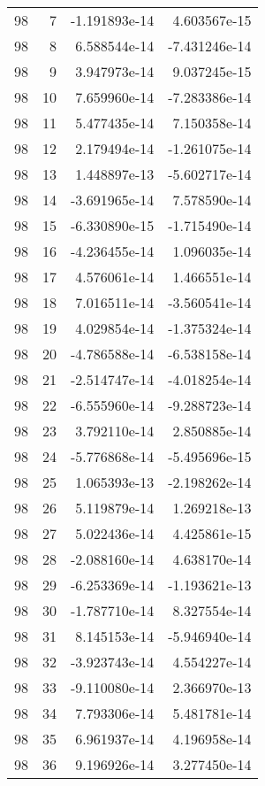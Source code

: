 \begin{tabular}{rrrr}
  98 &    7 & -1.191893e-14 &  4.603567e-15 \\
  98 &    8 &  6.588544e-14 & -7.431246e-14 \\
  98 &    9 &  3.947973e-14 &  9.037245e-15 \\
  98 &   10 &  7.659960e-14 & -7.283386e-14 \\
  98 &   11 &  5.477435e-14 &  7.150358e-14 \\
  98 &   12 &  2.179494e-14 & -1.261075e-14 \\
  98 &   13 &  1.448897e-13 & -5.602717e-14 \\
  98 &   14 & -3.691965e-14 &  7.578590e-14 \\
  98 &   15 & -6.330890e-15 & -1.715490e-14 \\
  98 &   16 & -4.236455e-14 &  1.096035e-14 \\
  98 &   17 &  4.576061e-14 &  1.466551e-14 \\
  98 &   18 &  7.016511e-14 & -3.560541e-14 \\
  98 &   19 &  4.029854e-14 & -1.375324e-14 \\
  98 &   20 & -4.786588e-14 & -6.538158e-14 \\
  98 &   21 & -2.514747e-14 & -4.018254e-14 \\
  98 &   22 & -6.555960e-14 & -9.288723e-14 \\
  98 &   23 &  3.792110e-14 &  2.850885e-14 \\
  98 &   24 & -5.776868e-14 & -5.495696e-15 \\
  98 &   25 &  1.065393e-13 & -2.198262e-14 \\
  98 &   26 &  5.119879e-14 &  1.269218e-13 \\
  98 &   27 &  5.022436e-14 &  4.425861e-15 \\
  98 &   28 & -2.088160e-14 &  4.638170e-14 \\
  98 &   29 & -6.253369e-14 & -1.193621e-13 \\
  98 &   30 & -1.787710e-14 &  8.327554e-14 \\
  98 &   31 &  8.145153e-14 & -5.946940e-14 \\
  98 &   32 & -3.923743e-14 &  4.554227e-14 \\
  98 &   33 & -9.110080e-14 &  2.366970e-13 \\
  98 &   34 &  7.793306e-14 &  5.481781e-14 \\
  98 &   35 &  6.961937e-14 &  4.196958e-14 \\
  98 &   36 &  9.196926e-14 &  3.277450e-14 \\

\end{tabular}
